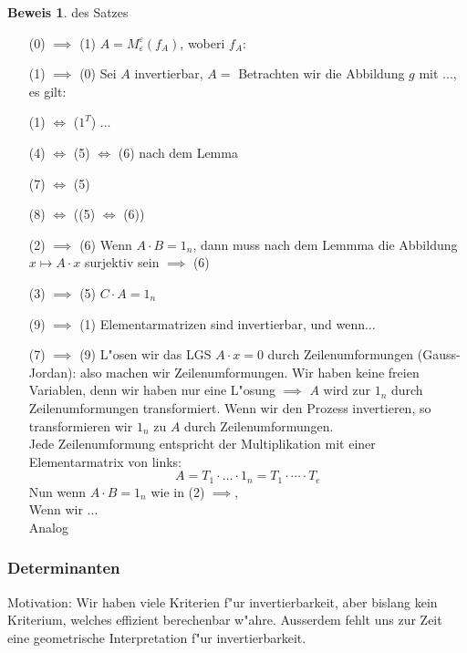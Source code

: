 \documentclass[11pt]{article}
\theoremstyle{remark}
\theoremstyle{definition}
\newtheorem{prof}{Beweis}
\theoremstyle{remark}
\begin{document}
\begin{prof}{des Satzes}\leavevmode
  \begin{itemize}
  \item[(0) $\implies$ (1)]  $A=M^{\varepsilon}_{\varepsilon}(f_A)$, woberi $f_A:$
  \item[(1) $\implies$ (0)] Sei $A$ invertierbar, $A=$ Betrachten wir die
    Abbildung $g$ mit ..., es gilt: 
  \item[(1) $\iff$ ($1^T$)] ...
  \item[(4) $ \iff $ (5) $ \iff $ (6)] nach dem Lemma
  \item[(7) $ \iff $ (5)]
  \item[(8) $ \iff $ ((5) $ \iff $ (6))]
  \item[(2) $ \implies $ (6)] Wenn $A\cdot B=1_n$, dann muss nach dem Lemmma die
    Abbildung $x\mapsto A\cdot x$ surjektiv sein $\implies$ (6)
  \item[(3) $ \implies $ (5)] $C\cdot A = 1_n$
  \item[(9) $ \implies $ (1)] Elementarmatrizen sind invertierbar, und wenn...
  \item[(7) $ \implies $ (9)] L"osen wir das LGS $A\cdot x = 0$ durch
    Zeilenumformungen (Gauss-Jordan): also machen wir Zeilenumformungen. Wir
    haben keine freien Variablen, denn wir haben nur eine L"osung $\implies$
    $A$ wird zur $1_n$ durch Zeilenumformungen transformiert. Wenn wir den
    Prozess invertieren, so transformieren wir $1_n$ zu $A$ durch
    Zeilenumformungen. \\
    Jede Zeilenumformung entspricht der Multiplikation mit einer
    Elementarmatrix von links: \[A=T_1 \cdot \dots \cdot 1_n = T_1 \cdot \cdots
      \cdot T_e\]
    Nun wenn $A\cdot B = 1_n$ wie in (2) $\implies$, \\
    Wenn wir ... \\
    Analog
  \end{itemize}
\end{prof}

\subsubsection{Determinanten}
\label{sec:det}

Motivation: Wir haben viele Kriterien f"ur invertierbarkeit, aber bislang kein
Kriterium, welches effizient berechenbar w"ahre. Ausserdem fehlt uns zur Zeit
eine geometrische Interpretation f"ur invertierbarkeit.
\end{document}
